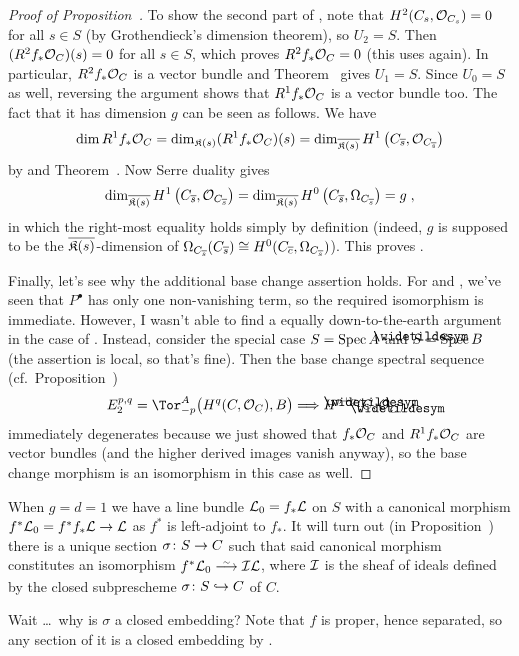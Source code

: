 \documentclass[a4paper,parskip=half,numbers=enddot, DIV=12]{scrreprt}
\begin{document}
\begin{proof}[Proof of Proposition~]
	To show the second part of , note that $H^2(C_s,\mathcal{O}_{C_s})=0$ for all $s\in S$ (by Grothendieck's dimension theorem), so $U_2=S$. Then $(R^2f_*\mathcal{O}_C)(s)=0$ for all $s\in S$, which proves $R^2f_*\mathcal{O}_C=0$ (this uses \cite[Lemma~1.5.1]{alg2} again). In particular, $R^2f_*\mathcal{O}_C$ is a vector bundle and Theorem~ gives $U_1=S$. Since $U_0=S$ as well, reversing the argument shows that $R^1f_*\mathcal{O}_C$ is a vector bundle too. The fact that it has dimension $g$ can be seen as follows. We have
	\begin{align*}
		\dim R^1f_*\mathcal{O}_C=\dim_{\mathfrak{K}(s)}(R^1f_*\mathcal{O}_C)(s)=\dim_{\overline{\mathfrak{K}(s)}}H^1\left(C_{\overline{s}},\mathcal{O}_{C_{\overline{s}}}\right)
	\end{align*}
	by  and Theorem~. Now Serre duality gives
	\begin{align*}
		\dim_{\overline{\mathfrak{K}(s)}}H^1\left(C_{\overline{s}},\mathcal{O}_{C_{\overline{s}}}\right)=\dim_{\overline{\mathfrak{K}(s)}}H^0\left(C_{\overline{s}},\Omega_{C_{\overline{s}}}\right)=g\;,
	\end{align*}
	in which the right-most equality holds simply by definition (indeed, $g$ is supposed to be the $\overline{\mathfrak{K}(s)}$-dimension of $\Omega_{C_{\overline{s}}}(C_{\overline{s}})\cong H^0(C_{\overline{c}},\Omega_{C_{\overline{s}}})$). This proves .
	
	Finally, let's see why the additional base change assertion holds. For  and , we've seen that $P^\bullet$ has only one non-vanishing term, so the required isomorphism is immediate. However, I wasn't able to find a equally down-to-the-earth argument in the case of . Instead, consider the special case $S=\operatorname{Spec} A$ and $\snake{S}=\Spec B$ (the assertion is local, so that's fine). Then the base change spectral sequence (cf.\ Proposition~)
	\begin{align*}
		E_2^{p,q}=\Tor_{-p}^A\big(H^q(C,\Oo_C),B\big)\converge H^{p+q}(\snake{C},\Oo_{\snake{C}})\;.
	\end{align*}
	immediately degenerates because we just showed that $f_*\mathcal{O}_C$ and $R^1f_*\mathcal{O}_C$ are vector bundles (and the higher derived images vanish anyway), so the base change morphism is an isomorphism in this case as well.
\end{proof}
\begin{rem}
	When $g=d=1$ we have a line bundle $\mathcal{L}_0=f_*\mathcal{L}$ on $S$ with a canonical morphism $f^*\Ll_0=f^*f_*\Ll\morphism\Ll$ as $f^*$ is left-adjoint to $f_*$. It will turn out (in Proposition~) there is a unique section $\sigma\colon S\morphism C$ such that said canonical morphism constitutes an isomorphism $f^*\Ll_0\isomorphism\Ii\Ll$, where $\mathcal{I}$ is the sheaf of ideals defined by the closed subprescheme $\sigma\colon S\monomorphism C$ of $C$.
	
	Wait \ldots\ why is $\sigma$ a closed embedding? Note that $f$ is proper, hence separated, so any section of it is a closed embedding by \cite[Proposition~1.5.5]{alggeo1}.
\end{rem}
\end{document}
